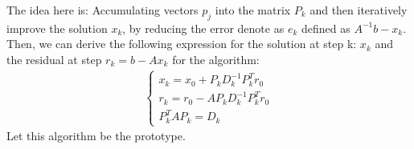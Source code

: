 \documentclass[]{article}
\theoremstyle{definition}
\begin{document}
            The idea here is: Accumulating vectors $p_j$ into the matrix $P_k$ and then iteratively improve the solution $x_k$, by reducing the error denote as $e_k$ defined as $A^{-1}b - x_k$. Then, we can derive the following expression for the solution at step k: $x_k$ and the residual at step $r_k = b - Ax_k$ for the algorithm: 
            \begin{align}
                \begin{cases}
                    x_k = x_0 + P_kD^{-1}_kP^T_kr_0
                    \\
                    r_k = r_0 - AP_kD^{-1}_kP^T_k r_0
                    \\
                    P^T_kAP_k = D_k
                \end{cases}
            \end{align}
            Let this algorithm be the prototype. 
\end{document}
